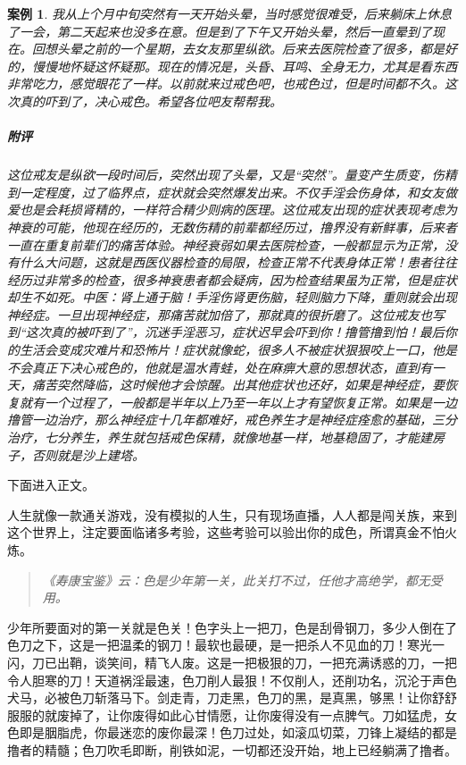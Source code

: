 \documentclass{ctexart}
\newtheorem{case}{案例}
\begin{document}
\begin{case}
    我从上个月中旬突然有一天开始头晕，当时感觉很难受，后来躺床上休息了一会，第二天起来也没多在意。但是到了下午又开始头晕，然后一直晕到了现在。回想头晕之前的一个星期，去女友那里纵欲。后来去医院检查了很多，都是好的，慢慢地怀疑这怀疑那。现在的情况是，头昏、耳鸣、全身无力，尤其是看东西非常吃力，感觉眼花了一样。以前就来过戒色吧，也戒色过，但是时间都不久。这次真的吓到了，决心戒色。希望各位吧友帮帮我。
    \subparagraph{附评} 这位戒友是纵欲一段时间后，突然出现了头晕，又是“突然”。量变产生质变，伤精到一定程度，过了临界点，症状就会突然爆发出来。不仅手淫会伤身体，和女友做爱也是会耗损肾精的，一样符合精少则病的医理。这位戒友出现的症状表现考虑为神衰的可能，他现在经历的，无数伤精的前辈都经历过，撸界没有新鲜事，后来者一直在重复前辈们的痛苦体验。神经衰弱如果去医院检查，一般都显示为正常，没有什么大问题，这就是西医仪器检查的局限，检查正常不代表身体正常！患者往往经历过非常多的检查，很多神衰患者都会疑病，因为检查结果虽为正常，但是症状却生不如死。中医：肾上通于脑！手淫伤肾更伤脑，轻则脑力下降，重则就会出现神经症。一旦出现神经症，那痛苦就加倍了，那就真的很折磨了。这位戒友也写到“这次真的被吓到了”，沉迷手淫恶习，症状迟早会吓到你！撸管撸到怕！最后你的生活会变成灾难片和恐怖片！症状就像蛇，很多人不被症状狠狠咬上一口，他是不会真正下决心戒色的，他就是温水青蛙，处在麻痹大意的思想状态，直到有一天，痛苦突然降临，这时候他才会惊醒。出其他症状也还好，如果是神经症，要恢复就有一个过程了，一般都是半年以上乃至一年以上才有望恢复正常。如果是一边撸管一边治疗，那么神经症十几年都难好，戒色养生才是神经症痊愈的基础，三分治疗，七分养生，养生就包括戒色保精，就像地基一样，地基稳固了，才能建房子，否则就是沙上建塔。
\end{case}

下面进入正文。

人生就像一款通关游戏，没有模拟的人生，只有现场直播，人人都是闯关族，来到这个世界上，注定要面临诸多考验，这些考验可以验出你的成色，所谓真金不怕火炼。

\begin{quote}\it
    《寿康宝鉴》云：色是少年第一关，此关打不过，任他才高绝学，都无受用。
\end{quote}

少年所要面对的第一关就是色关！色字头上一把刀，色是刮骨钢刀，多少人倒在了色刀之下，这是一把温柔的钢刀！最软也最硬，是一把杀人不见血的刀！寒光一闪，刀已出鞘，谈笑间，精飞人废。这是一把极狠的刀，一把充满诱惑的刀，一把令人胆寒的刀！天道祸淫最速，色刀削人最狠！不仅削人，还削功名，沉沦于声色犬马，必被色刀斩落马下。剑走青，刀走黑，色刀的黑，是真黑，够黑！让你舒舒服服的就废掉了，让你废得如此心甘情愿，让你废得没有一点脾气。刀如猛虎，女色即是胭脂虎，你最迷恋的废你最深！色刀过处，如滚瓜切菜，刀锋上凝结的都是撸者的精髓；色刀吹毛即断，削铁如泥，一切都还没开始，地上已经躺满了撸者。
\end{document}
